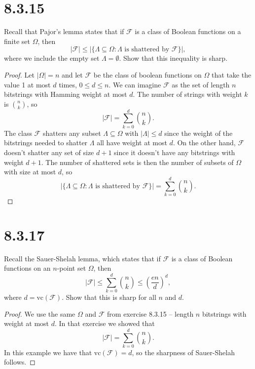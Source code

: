 \documentclass[11pt,letterpaper]{report}
\newcommand{\mcal}[1]{\mathcal{#1}}
\newcommand{\vc}{\text{vc}}
\begin{document}
\section*{8.3.15}
Recall that Pajor's lemma states that if $\mcal{F}$ is a class of Boolean functions on a finite set $\Omega$, then
\[
|\mcal{F}|\leq |\{\Lambda\subseteq \Omega: \Lambda\text{ is shattered by }\mcal{F}\}|,
\]
where we include the empty set $\Lambda = \emptyset$. Show that this inequality is sharp.
\begin{proof}
	Let $|\Omega| = n$ and let $\mcal{F}$ be the class of boolean functions on $\Omega$ that take the value 1 at most $d$ times, $0\leq d\leq n$. We can imagine $\mcal{F}$ as the set of length $n$ bitstrings with Hamming weight at most $d$. The number of strings with weight $k$ is $\binom{n}{k}$, so
	\[
	|\mcal{F}| = \sum_{k=0}^d\binom{n}{k}.
	\]
	The class $\mcal{F}$ shatters any subset $\Lambda \subseteq \Omega$ with $|\Lambda|\leq d$ since the weight of the bitstrings needed to shatter $\Lambda$ all have weight at most $d$. On the other hand, $\mcal{F}$ doesn't shatter any set of size $d+1$ since it doesn't have any bitstrings with weight $d+1$. The number of shattered sets is then the number of subsets of $\Omega$ with size at most $d$, so
	\[
	|\{\Lambda\subseteq \Omega: \Lambda\text{ is shattered by }\mcal{F}\}| = \sum_{k=0}^d\binom{n}{k}.
	\]
\end{proof}










\section*{8.3.17}
Recall the Sauer-Shelah lemma, which states that if $\mcal{F}$ is a class of Boolean functions on an $n$-point set $\Omega$, then
\[
|\mcal{F}|\leq \sum_{k=0}^d\binom{n}{k}\leq \left(\frac{en}{d}\right)^d,
\]
where $d= \vc(\mcal{F})$. Show that this is sharp for all $n$ and $d$.
\begin{proof}
	We use the same $\Omega$ and $\mcal{F}$ from exercise 8.3.15 -- length $n$ bitstrings with weight at most $d$. In that exercise we showed that
	\[
	|\mcal{F}| = \sum_{k=0}^d\binom{n}{k}.
	\]
	In this example we have that $\vc(\mcal{F}) = d$, so the sharpness of Sauer-Shelah follows.
\end{proof}
\end{document}
